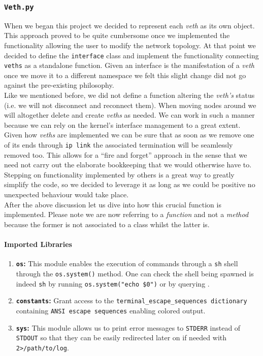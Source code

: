\subsubsection{\texttt{Veth.py}}
    When we began this project we decided to represent each \textit{veth} as its own object. This approach proved to be quite cumbersome once we implemented the functionality allowing the user to modify the network topology. At that point we decided to define the \texttt{interface} class and implement the functionality connecting \texttt{veths} as a standalone function. Given an interface is the manifestation of a \textit{veth} once we move it to a different namespace we felt this slight change did not go against the pre-existing philosophy.\\

    Like we mentioned before, we did not define a function altering the \textit{veth's} status (i.e. we will not disconnect and reconnect them). When moving nodes around we will altogether delete and create \textit{veths} as needed. We can work in such a manner because we  can rely on the kernel's interface management to a great extent. Given how \textit{veths} are implemented we can be sure that as soon as we remove one of its ends through \texttt{ip link} the associated termination will be seamlessly removed too. This allows for a ``fire and forget'' approach in the sense that we need not carry out the elaborate bookkeeping that we would otherwise have to. Stepping on functionality implemented by others is a great way to greatly simplify the code, so we decided to leverage it as long as we could be positive no unexpected behaviour would take place.\\

    After the above discussion let us dive into how this crucial function is implemented. Please note we are now referring to a \textit{function} and not a \textit{method} because the former is not associated to a class whilst the latter is.\\

    \paragraph{Imported Libraries}
        \begin{enumerate}
            \item \textbf{\texttt{os}:} This module enables the execution of commands through a \texttt{sh} shell through the \texttt{os.system()} method. One can check the shell being spawned is indeed \texttt{sh} by running \texttt{\allowbreak os.system("echo \$0")} or by querying \cite{bib:man-system}.
            \item \textbf{\texttt{constants}:} Grant access to the \texttt{\allowbreak terminal\_escape\_sequences dictionary} containing \texttt{ANSI escape sequences} enabling colored output.
            \item \textbf{\texttt{sys}:} This module allows us to print error messages to \texttt{STDERR} instead of \texttt{STDOUT} so that they can be easily redirected later on if needed with \texttt{2>/path/to/log}.
        \end{enumerate}

